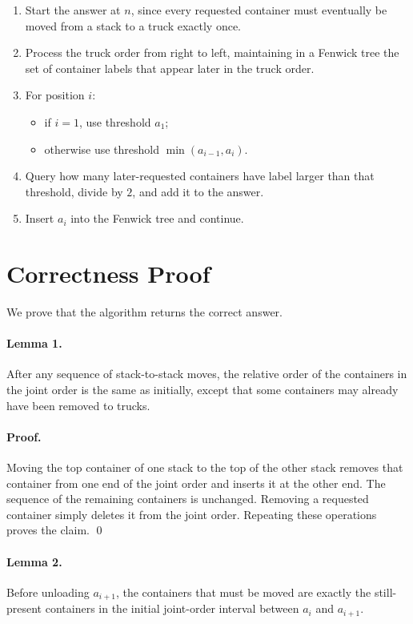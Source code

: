 \documentclass[11pt]{article}
\begin{document}
\begin{enumerate}[leftmargin=*]
    \item Start the answer at $n$, since every requested container must eventually be moved from a stack
    to a truck exactly once.
    \item Process the truck order from right to left, maintaining in a Fenwick tree the set of container
    labels that appear later in the truck order.
    \item For position $i$:
    \begin{itemize}[leftmargin=*]
        \item if $i=1$, use threshold $a_1$;
        \item otherwise use threshold $\min(a_{i-1},a_i)$.
    \end{itemize}
    \item Query how many later-requested containers have label larger than that threshold, divide by $2$,
    and add it to the answer.
    \item Insert $a_i$ into the Fenwick tree and continue.
\end{enumerate}

\section*{Correctness Proof}

We prove that the algorithm returns the correct answer.

\paragraph{Lemma 1.}
After any sequence of stack-to-stack moves, the relative order of the containers in the joint order is the
same as initially, except that some containers may already have been removed to trucks.

\paragraph{Proof.}
Moving the top container of one stack to the top of the other stack removes that container from one end of
the joint order and inserts it at the other end. The sequence of the remaining containers is unchanged.
Removing a requested container simply deletes it from the joint order. Repeating these operations proves
the claim. \qed

\paragraph{Lemma 2.}
Before unloading $a_{i+1}$, the containers that must be moved are exactly the still-present containers in
the initial joint-order interval between $a_i$ and $a_{i+1}$.
\end{document}
